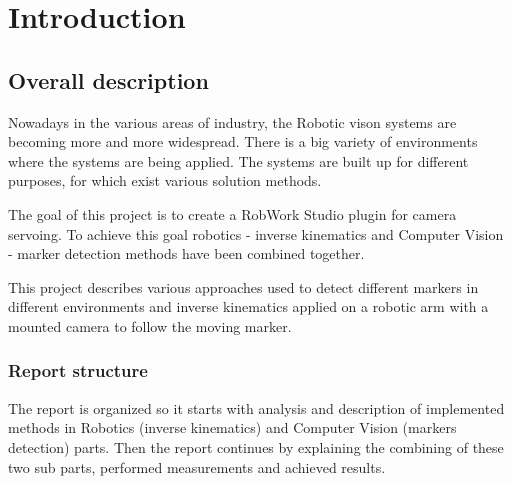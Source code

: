 \chapter{Introduction}
\label{chap:introduction}

\section{Overall description}
Nowadays in the various areas of industry, the Robotic vison systems are becoming more and more widespread. There is a big variety of environments where the systems are being applied. The systems are built up for different purposes, for which exist various solution methods. 

The goal of this project is to create a RobWork Studio plugin for camera servoing. To achieve this goal robotics - inverse kinematics and Computer Vision - marker detection methods have been combined together. 

This project describes various approaches used to detect different markers in different environments and inverse kinematics applied on a robotic arm with a mounted camera to follow the moving marker. 

\subsection{Report structure}
The report is organized so it starts with analysis and description of implemented methods in Robotics (inverse kinematics) and Computer Vision (markers detection) parts. Then the report continues by explaining the combining of these two sub parts, performed measurements and achieved results. 